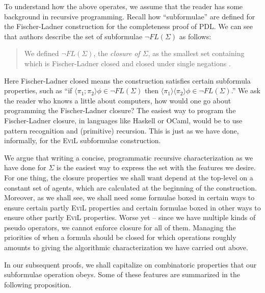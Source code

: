 To understand how the above operates, we assume that the reader has
some background in recursive programming.  Recall how ``subformulae''
are defined for the Fischer-Ladner construction for the completeness
proof of PDL. We can see that authors describe the set of subformulae
$\neg FL(\Sigma)$ as follows:
\begin{quote}  We defined $\neg FL(\Sigma)$, the \emph{closure of
    $\Sigma$}, as the smallest set containing which is Fischer-Ladner
  closed and closed under single negations \cite[pg. 243]{blackburn_modal_2001}.
\end{quote}
Here Fischer-Ladner closed means the construction satisfies certain
subformula properties, such as ``if $\langle \pi_1 ; \pi_2 \rangle
\phi \in \neg FL(\Sigma)$ then $\langle \pi_1 \rangle \langle \pi_2
\rangle \phi \in \neg FL(\Sigma)$.'' We ask the reader who knows a
little about computers, how would one go about programming 
the Fischer-Ladner closure?  
The easiest way to program the Fischer-Ladner closure, in
languages like \textsf{Haskell} or \textsf{OCaml}, would
be to use pattern recognition and (primitive) recursion.  
This is just as we have done, informally, for the \textsc{EviL} subformulae construction.

We argue that writing a concise, programmatic recursive
characterization as we have done for $\Sigma$ is the easiest way to
express the set with the features we desire. 
For one thing, the closure properties we shall
want depend at the top-level on a constant set of agents,
which are calculated at the beginning of the construction.  
Moreover, as we shall see, we shall need some formulae boxed
in certain ways to ensure certain partly \textsc{EviL} properties and
certain formulae boxed in other ways to ensure other partly \textsc{EviL}
properties.  Worse yet -- since we have multiple kinds of pseudo
operators, we cannot enforce closure for all of them.  Managing
the priorities of when a formula should be closed for which operations
roughly amounts to giving the algorithmic characterization we have
carried out above.

In our subsequent proofs, we shall capitalize on combinatoric
properties that our subformulae operation obeys.  Some of these
features are summarized in the following proposition.  

